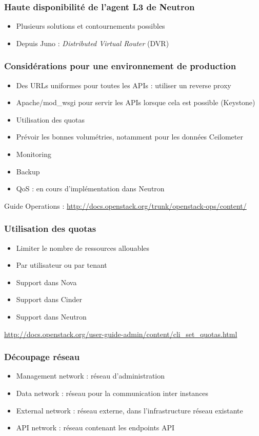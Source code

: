  \begin{frame}
    \frametitle{Haute disponibilité de l'agent L3 de Neutron}
    \begin{itemize}
      \item Plusieurs solutions et contournements possibles
      \item Depuis Juno : \textit{Distributed Virtual Router} (DVR)
    \end{itemize}
  \end{frame}

  \begin{frame}
    \frametitle{Considérations pour une environnement de production}
    \begin{itemize}
      \item Des URLs uniformes pour toutes les APIs : utiliser un reverse proxy
      \item Apache/mod\_wsgi pour servir les APIs lorsque cela est possible (Keystone)
      \item Utilisation des quotas
      \item Prévoir les bonnes volumétries, notamment pour les données Ceilometer
      \item Monitoring
      \item Backup
      \item QoS : en cours d'implémentation dans Neutron
    \end{itemize}
    Guide Operations : \url{http://docs.openstack.org/trunk/openstack-ops/content/}
  \end{frame}

  \begin{frame}
    \frametitle{Utilisation des quotas}
    \begin{itemize}
      \item Limiter le nombre de ressources allouables
      \item Par utilisateur ou par tenant
      \item Support dans Nova
      \item Support dans Cinder
      \item Support dans Neutron
    \end{itemize}
    \url{http://docs.openstack.org/user-guide-admin/content/cli_set_quotas.html}
  \end{frame}

  \begin{frame}
  \frametitle{Découpage réseau}
    \begin{itemize}
      \item Management network : réseau d'administration
      \item Data network : réseau pour la communication inter instances
      \item External network : réseau externe, dans l'infrastructure réseau existante
      \item API network : réseau contenant les endpoints API
    \end{itemize}
  \end{frame}

